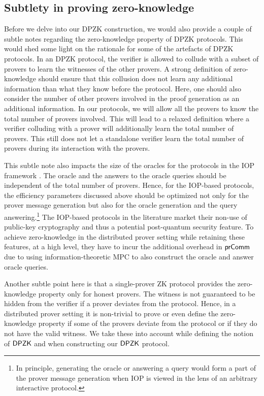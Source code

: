 \subsection{Subtlety in proving zero-knowledge}
Before we delve into our DPZK construction, we would also provide a couple of subtle notes regarding the zero-knowledge property of DPZK protocols. This would shed some light on the rationale for some of the artefacts of DPZK protocols. In an DPZK protocol, the verifier is allowed to collude with a subset of provers to learn the witnesses of the other provers. A strong definition of zero-knowledge should ensure that this collusion does not learn any additional information than what they know before the protocol. Here, one should also consider the number of other provers involved in the proof generation as an additional information. In our protocols, we will allow all the provers to know the total number of provers involved. This will lead to a relaxed definition where a verifier colluding with a prover will additionally learn the total number of provers. This still does not let a standalone verifier learn the total number of provers during its interaction with the provers.

This subtle note also impacts the size of the oracles for the protocols in the IOP framework \cite{aurora, ligero}. The oracle and the answers to the oracle queries should be independent of the total number of provers. Hence, for the IOP-based protocols, the efficiency parameters discussed above should be optimized not only for the prover message generation but also for the oracle generation and the query answering.\footnote{In principle, generating the oracle or answering a query would form a part of the prover message generation when IOP is viewed in the lens of an arbitrary interactive protocol.}
The IOP-based protocols in the literature \cite{aurora, ligero} market their non-use of public-key cryptography and thus a potential post-quantum security feature. To achieve zero-knowledge in the distributed prover setting while retaining these features, at a high level, they have to incur the additional overhead in $\mathsf{prComm}$ due to using information-theoretic MPC to also construct the oracle and answer oracle queries. %

Another subtle point here is that a single-prover ZK protocol provides the zero-knowledge property only for honest provers. The witness is not guaranteed to be hidden from the verifier if a prover deviates from the protocol. Hence, in a distributed prover setting it is non-trivial to prove or even define the zero-knowledge property if some of the provers deviate from the protocol or if they do not have the valid witness. We take these into account while defining the notion of $\mathsf{DPZK}$ and when constructing our $\mathsf{DPZK}$ protocol.

